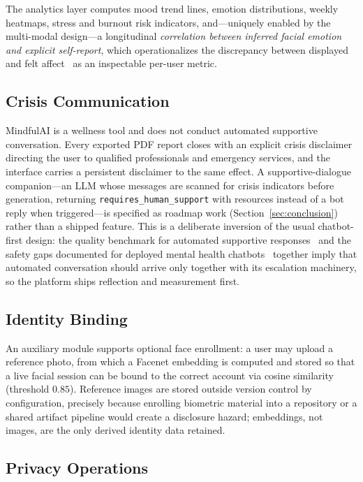 \documentclass[11pt,a4paper]{article}
\newcommand{\system}{MindfulAI}
\begin{document}
The analytics layer computes mood trend lines, emotion distributions, weekly heatmaps, stress and burnout risk indicators, and---uniquely enabled by the multi-modal design---a longitudinal \emph{correlation between inferred facial emotion and explicit self-report}, which operationalizes the discrepancy between displayed and felt affect~\cite{barrett2019,poria2017} as an inspectable per-user metric.

\subsection{Crisis Communication}\label{sec:chat}

\system{} is a wellness tool and does not conduct automated supportive conversation. Every exported PDF report closes with an explicit crisis disclaimer directing the user to qualified professionals and emergency services, and the interface carries a persistent disclaimer to the same effect. A supportive-dialogue companion---an LLM whose messages are scanned for crisis indicators before generation, returning \texttt{requires\_\allowbreak human\_\allowbreak support} with resources instead of a bot reply when triggered---is specified as roadmap work (Section~\ref{sec:conclusion}) rather than a shipped feature. This is a deliberate inversion of the usual chatbot-first design: the quality benchmark for automated supportive responses~\cite{ayers2023} and the safety gaps documented for deployed mental health chatbots~\cite{abdalrazaq2019,abdalrazaq2020} together imply that automated conversation should arrive only together with its escalation machinery, so the platform ships reflection and measurement first.

\subsection{Identity Binding}

An auxiliary module supports optional face enrollment: a user may upload a reference photo, from which a Facenet embedding is computed and stored so that a live facial session can be bound to the correct account via cosine similarity (threshold $0.85$). Reference images are stored outside version control by configuration, precisely because enrolling biometric material into a repository or a shared artifact pipeline would create a disclosure hazard; embeddings, not images, are the only derived identity data retained.

\subsection{Privacy Operations}
\end{document}
